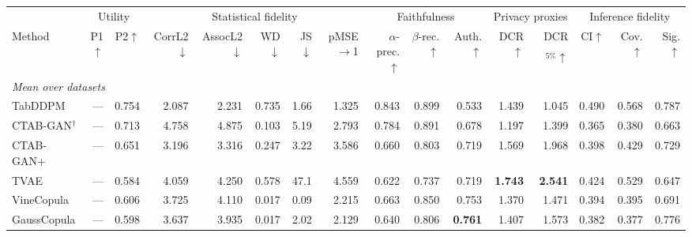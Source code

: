 \begingroup\setlength{\tabcolsep}{1.5pt}
\begin{tabular}{lrrrrrrrrrrrrrrr}
\toprule
 & \multicolumn{2}{c}{Utility} & \multicolumn{5}{c}{Statistical fidelity} & \multicolumn{3}{c}{Faithfulness} & \multicolumn{2}{c}{Privacy proxies} & \multicolumn{3}{c}{Inference fidelity} \\
\cmidrule(lr){2-3} \cmidrule(lr){4-8} \cmidrule(lr){9-11} \cmidrule(lr){12-13} \cmidrule(lr){14-16}
Method & P1$\uparrow$ & P2$\uparrow$ & CorrL2$\downarrow$ & AssocL2$\downarrow$ & WD$\downarrow$ & JS$\downarrow$ & pMSE$\to$1 & $\alpha$-prec.$\uparrow$ & $\beta$-rec.$\uparrow$ & Auth.$\uparrow$ & DCR$\uparrow$ & DCR$_{5\%}\uparrow$ & CI$\uparrow$ & Cov.$\uparrow$ & Sig.$\uparrow$ \\
\midrule
\multicolumn{16}{l}{\emph{Mean over datasets}} \\
TabDDPM & --- & 0.754 & 2.087 & 2.231 & 0.735 & 1.66 & 1.325 & 0.843 & 0.899 & 0.533 & 1.439 & 1.045 & 0.490 & 0.568 & 0.787 \\
CTAB-GAN$^{\dagger}$ & --- & 0.713 & 4.758 & 4.875 & 0.103 & 5.19 & 2.793 & 0.784 & 0.891 & 0.678 & 1.197 & 1.399 & 0.365 & 0.380 & 0.663 \\
CTAB-GAN+ & --- & 0.651 & 3.196 & 3.316 & 0.247 & 3.22 & 3.586 & 0.660 & 0.803 & 0.719 & 1.569 & 1.968 & 0.398 & 0.429 & 0.729 \\
TVAE & --- & 0.584 & 4.059 & 4.250 & 0.578 & 47.1 & 4.559 & 0.622 & 0.737 & 0.719 & \textbf{1.743} & \textbf{2.541} & 0.424 & 0.529 & 0.647 \\
\addlinespace[2pt]
VineCopula & --- & 0.606 & 3.725 & 4.110 & 0.017 & 0.09 & 2.215 & 0.663 & 0.850 & 0.753 & 1.370 & 1.471 & 0.394 & 0.395 & 0.691 \\
GaussCopula & --- & 0.598 & 3.637 & 3.935 & 0.017 & 2.02 & 2.129 & 0.640 & 0.806 & \textbf{0.761} & 1.407 & 1.573 & 0.382 & 0.377 & 0.776 \\

\end{tabular}

